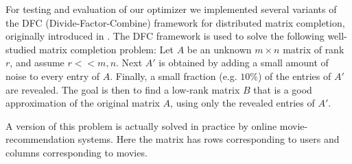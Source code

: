 For testing and evaluation of our optimizer we implemented several variants of the DFC (Divide-Factor-Combine) framework for distributed matrix completion, originally introduced in \cite{Ameet}. The DFC framework is used to solve the following well-studied matrix completion problem: Let $A$ be an unknown $m\times n$ matrix of rank $r$, and assume $r<<m,n$. Next $A'$ is obtained by adding a small amount of noise to every entry of $A$. Finally, a small fraction (e.g. $10\%$) of the entries of $A'$ are revealed. The goal is then to find a low-rank matrix $B$ that is a good approximation of the original matrix $A$, using only the revealed entries of $A'$.

A version of this problem is actually solved in practice by online movie-recommendation systems. Here the matrix has rows corresponding to users and columns corresponding to movies.